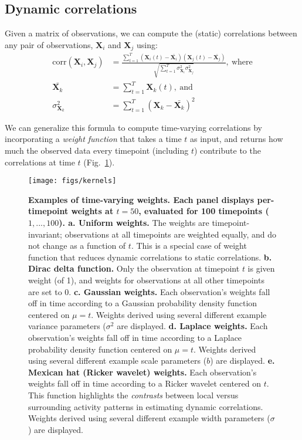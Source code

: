 \documentclass[english]{article}
\begin{document}
\subsection*{Dynamic correlations}
Given a matrix of observations, we can compute the (static)
correlations between any pair of observations, $\mathbf{X}_i$ and
$\mathbf{X}_j$ using:
\begin{align}
  \mathrm{corr}(\mathbf{X}_i, \mathbf{X}_j) &= \frac{\sum_{t=1}^T \left(\mathbf{X}_i(t)
                                              -
                                              \bar{\mathbf{X}_i}\right) \left(\mathbf{X}_j(t)
                                              -
                                              \bar{\mathbf{X}_j}\right)}{\sqrt{\sum_{t=1}^T
                                              \sigma^2_{\mathbf{X}_i} 
                                              \sigma^2_{\mathbf{X}_j}}},~\mathrm{where}\\\label{eqn:corr}
  \bar{\mathbf{X}_k} &= \sum_{t=1}^T
                       \mathbf{X}_k(t),~\mathrm{and}\\
  \sigma^2_{\mathbf{X}_k} &= \sum_{t=1}^T \left( \mathbf{X}_k -
                            \bar{\mathbf{X}_k} \right)^2 
\end{align}

We can generalize this formula to compute time-varying correlations by
incorporating a \textit{weight function} that takes a time $t$ as input,
and returns how much the observed data every timepoint (including $t$)
contribute to the correlations at time $t$ (Fig.~\ref{fig:weights}).
\begin{figure}
  \centering
  \texttt{[image: figs/kernels]}
  \caption{\textbf{Examples of time-varying weights.  Each panel
      displays per-timepoint weights at $t = 50$, evaluated for 100
      timepoints ($1, ..., 100$).  a. Uniform weights.} The weights
    are timepoint-invariant; observations at all timepoints are
    weighted equally, and do not change as a function of $t$.  This is
    a special case of weight function that reduces dynamic
    correlations to static correlations.  \textbf{b. Dirac delta
      function.} Only the observation at timepoint $t$ is given weight
    (of 1), and weights for observations at all other timepoints are
    set to 0.  \textbf{c. Gaussian weights.} Each observation's
    weights fall off in time according to a Gaussian probability
    density function centered on $\mu = t$.  Weights derived using
    several different example variance parameters ($\sigma^2$ are
    displayed.  \textbf{d. Laplace weights.}  Each observation's
    weights fall off in time according to a Laplace probability
    density function centered on $\mu = t$.  Weights derived using
    several different example scale parameters ($b$) are displayed.
    \textbf{e. Mexican hat (Ricker wavelet) weights.}  Each
    observation's weights fall off in time according to a Ricker
    wavelet centered on $t$.  This function highlights the
    \textit{contrasts} between local versus surrounding activity
    patterns in estimating dynamic correlations. Weights derived using
    several different example width parameters ($\sigma$) are
    displayed.  }
  \label{fig:weights}
\end{figure}
\end{document}
